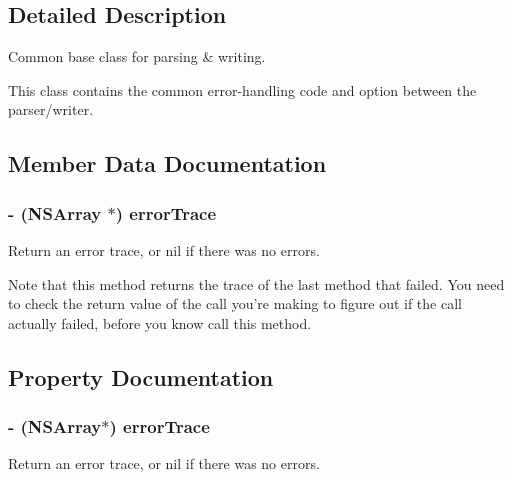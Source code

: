 \subsection{\-Detailed \-Description}
\-Common base class for parsing \& writing. 

\-This class contains the common error-\/handling code and option between the parser/writer. 

\subsection{\-Member \-Data \-Documentation}
\hypertarget{interface_s_b_json_base_a38a6b6f8e196d417ea38ee82274e30bb}{
\subsubsection[{error\-Trace}]{\setlength{\rightskip}{0pt plus 5cm}-\/ (\-N\-S\-Array $\ast$) {\bf error\-Trace}}}
\label{interface_s_b_json_base_a38a6b6f8e196d417ea38ee82274e30bb}


\-Return an error trace, or nil if there was no errors. 

\-Note that this method returns the trace of the last method that failed. \-You need to check the return value of the call you're making to figure out if the call actually failed, before you know call this method. 

\subsection{\-Property \-Documentation}
\hypertarget{interface_s_b_json_base_aa83f0ee5efade2fd26ddf6591ffd8dc0}{
\subsubsection[{error\-Trace}]{\setlength{\rightskip}{0pt plus 5cm}-\/ (\-N\-S\-Array$\ast$) {\bf error\-Trace}}}
\label{interface_s_b_json_base_aa83f0ee5efade2fd26ddf6591ffd8dc0}


\-Return an error trace, or nil if there was no errors. 

